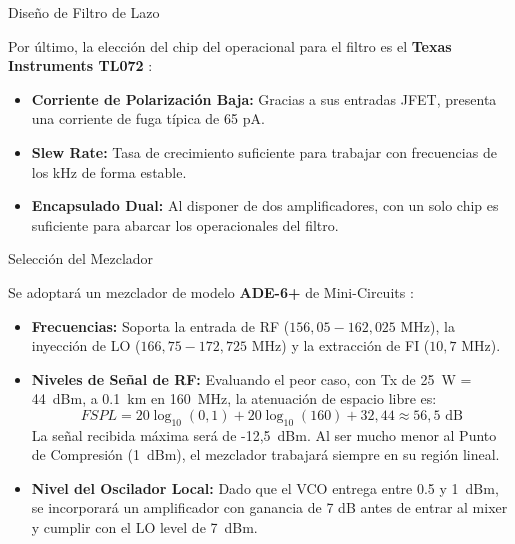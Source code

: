 \documentclass[10pt]{beamer}
\begin{document}
\begin{frame}{Diseño de Filtro de Lazo}
    
Por último, la elección del chip del operacional para el filtro es el \textbf{Texas Instruments TL072} \cite{opamp}:

\vspace{0.2cm}
\begin{itemize}
    \item \textbf{Corriente de Polarización Baja:} Gracias a sus entradas JFET, presenta una corriente de fuga típica de 65 pA.
    \item \textbf{Slew Rate:} Tasa de crecimiento suficiente para trabajar con frecuencias de los kHz de forma estable.
    \item \textbf{Encapsulado Dual:} Al disponer de dos amplificadores, con un solo chip es suficiente para abarcar los operacionales del filtro.
\end{itemize}

\end{frame}

\begin{frame}{Selección del Mezclador}

Se adoptará un mezclador de modelo \textbf{ADE-6+} de Mini-Circuits \cite{ad6}:

\vspace{0.1cm}
\begin{itemize}
    \item \textbf{Frecuencias:} Soporta la entrada de RF ($156,05-162,025\text{ MHz}$), la inyección de LO ($166,75-172,725\text{ MHz}$) y la extracción de FI ($10,7\text{ MHz}$).
    
    \item \textbf{Niveles de Señal de RF:} Evaluando el peor caso, con Tx de 25~W = 44~dBm, a 0.1~km en 160~MHz, la atenuación de espacio libre \cite{fspl} es:
    $$FSPL = 20 \log_{10}(0,1) + 20 \log_{10}(160) + 32,44 \approx 56,5\text{ dB}$$
    La señal recibida máxima será de -12,5~dBm. Al ser mucho menor al Punto de Compresión (1~dBm), el mezclador trabajará siempre en su región lineal.

    \item \textbf{Nivel del Oscilador Local:} Dado que el VCO entrega entre 0.5 y 1~dBm, se incorporará un amplificador con ganancia de 7 dB antes de entrar al mixer y cumplir con el LO level de 7~dBm.
    
\end{itemize}



\end{frame}
\end{document}
